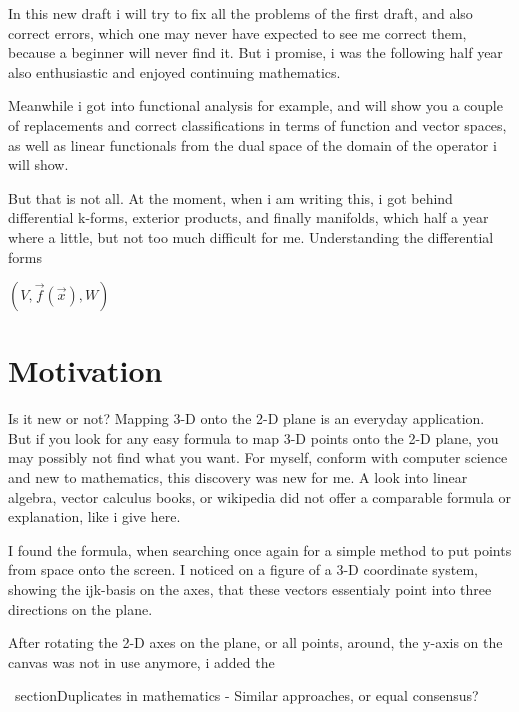 \documentclass[a4paper]{article}
\begin{document}
In this new draft i will try to fix all the problems of the first draft, and also correct errors, which one may never have expected to see me correct them, because a beginner will never find it. But i promise, i was the following half year also enthusiastic and enjoyed continuing mathematics.

Meanwhile i got into functional analysis for example, and will show you a couple of replacements and correct classifications in terms of function and vector spaces, as well as linear functionals from the dual space of the domain of the operator i will show.

But that is not all. At the moment, when i am writing this, i got behind differential k-forms, exterior products, and finally manifolds, which half a year where a little, but not too much difficult for me. Understanding the differential forms 



  $(V, \vec{f}(\vec{x}), W)$ 



\section{Motivation}

Is it new or not? Mapping 3-D onto the 2-D plane is an everyday application. But if you look for any easy formula to map 3-D points onto the 2-D plane, you may possibly not find what you want. For myself, conform with computer science and new to mathematics, this discovery was new for me. A look into linear algebra, vector calculus books, or wikipedia did not offer a comparable formula or explanation, like i give here.

I found the formula, when searching once again for a simple method to put points from space onto the screen. I noticed on a figure of a 3-D coordinate system, showing the ijk-basis on the axes, that these vectors essentialy point into three directions on the plane. 

After rotating the 2-D axes on the plane, or all points, around, the y-axis on the canvas was not in use anymore, i added the

\ section{Duplicates in mathematics - Similar approaches, or equal consensus?}
\end{document}
